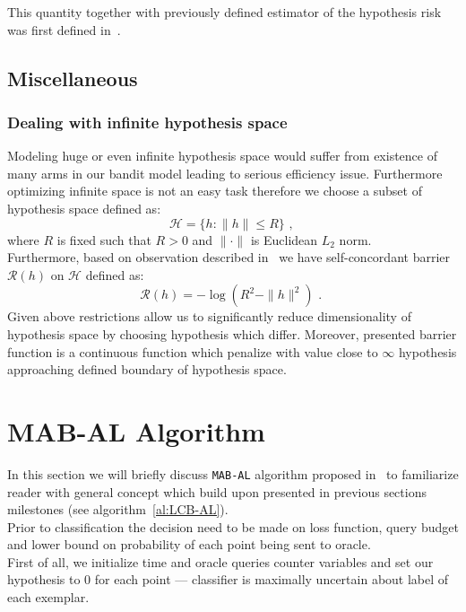 \documentclass[12pt, a4paper, pdflatex, leqno]{report}
\begin{document}
This quantity together with previously defined estimator of the hypothesis risk was first defined in~\citep{DBLP:journals/corr/GantiG13}.\\


\subsection{Miscellaneous}
\subsubsection{Dealing with infinite hypothesis space}
Modeling huge or even infinite hypothesis space would suffer from existence of many arms in our bandit model leading to serious efficiency issue. Furthermore optimizing infinite space is not an easy task therefore we choose a subset of hypothesis space defined as:
$$
\mathscr{H} = \{ h : \|h\| \leq R \} \text{~,~}
$$
where $R$ is fixed such that $R > 0$ and $\| \cdot \|$ is Euclidean $L_2$ norm.\\
Furthermore, based on observation described in~\citep{Abernethy08competingin} we have self-concordant barrier $\mathscr{R}(h)$ on $\mathscr{H}$ defined as:
$$
\mathscr{R}(h) = - \log(R^2 - \|h\|^2) \text{~.~}
$$
Given above restrictions allow us to significantly reduce dimensionality of hypothesis space by choosing hypothesis which differ. Moreover, presented barrier function is a continuous function which penalize with value close to $\infty$ hypothesis approaching defined boundary of hypothesis space.\\


\section{MAB-AL Algorithm}

In this section we will briefly discuss \texttt{MAB-AL} algorithm proposed in~\citep{DBLP:journals/corr/GantiG13} to familiarize reader with general concept which build upon presented in previous sections milestones (see algorithm~\ref{al:LCB-AL}). \\Prior to classification the decision need to be made on loss function, query budget and lower bound on probability of each point being sent to oracle.\\

First of all, we initialize time and oracle queries counter variables and set our hypothesis to $0$ for each point --- classifier is maximally uncertain about label of each exemplar.\\
\end{document}
